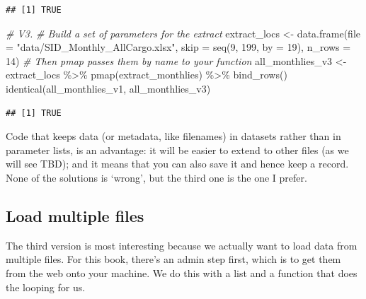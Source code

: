 \documentclass[
]{book}
\newenvironment{Shaded}{\begin{snugshade}}{\end{snugshade}}
\newcommand{\AttributeTok}[1]{\textcolor[rgb]{0.77,0.63,0.00}{#1}}
\newcommand{\CommentTok}[1]{\textcolor[rgb]{0.56,0.35,0.01}{\textit{#1}}}
\newcommand{\DecValTok}[1]{\textcolor[rgb]{0.00,0.00,0.81}{#1}}
\newcommand{\FunctionTok}[1]{\textcolor[rgb]{0.00,0.00,0.00}{#1}}
\newcommand{\NormalTok}[1]{#1}
\newcommand{\OtherTok}[1]{\textcolor[rgb]{0.56,0.35,0.01}{#1}}
\newcommand{\SpecialCharTok}[1]{\textcolor[rgb]{0.00,0.00,0.00}{#1}}
\newcommand{\StringTok}[1]{\textcolor[rgb]{0.31,0.60,0.02}{#1}}
\begin{document}
\begin{verbatim}
## [1] TRUE
\end{verbatim}

\begin{Shaded}
\begin{Highlighting}[]
\CommentTok{\# V3.}
\CommentTok{\# Build a set of parameters for the extract}
\NormalTok{extract\_locs }\OtherTok{\textless{}{-}} \FunctionTok{data.frame}\NormalTok{(}\AttributeTok{file =} \StringTok{"data/SID\_Monthly\_AllCargo.xlsx"}\NormalTok{,}
                       \AttributeTok{skip =} \FunctionTok{seq}\NormalTok{(}\DecValTok{9}\NormalTok{, }\DecValTok{199}\NormalTok{, }\AttributeTok{by =} \DecValTok{19}\NormalTok{),}
                       \AttributeTok{n\_rows =} \DecValTok{14}\NormalTok{)}
\CommentTok{\# Then pmap passes them by name to your function}
\NormalTok{all\_monthlies\_v3 }\OtherTok{\textless{}{-}}\NormalTok{ extract\_locs }\SpecialCharTok{\%\textgreater{}\%} 
  \FunctionTok{pmap}\NormalTok{(extract\_monthlies) }\SpecialCharTok{\%\textgreater{}\%} 
  \FunctionTok{bind\_rows}\NormalTok{()}
\FunctionTok{identical}\NormalTok{(all\_monthlies\_v1, all\_monthlies\_v3)}
\end{Highlighting}
\end{Shaded}

\begin{verbatim}
## [1] TRUE
\end{verbatim}

Code that keeps data (or metadata, like filenames) in datasets rather than in parameter lists, is an advantage: it will be easier to extend to other files (as we will see TBD); and it means that you can also save it and hence keep a record. None of the solutions is `wrong', but the third one is the one I prefer.

\hypertarget{loadMultipleFiles}{%
\subsection{Load multiple files}\label{loadMultipleFiles}}

The third version is most interesting because we actually want to load data from multiple files. For this book, there's an admin step first, which is to get them from the web onto your machine. We do this with a list and a function that does the looping for us.
\end{document}
